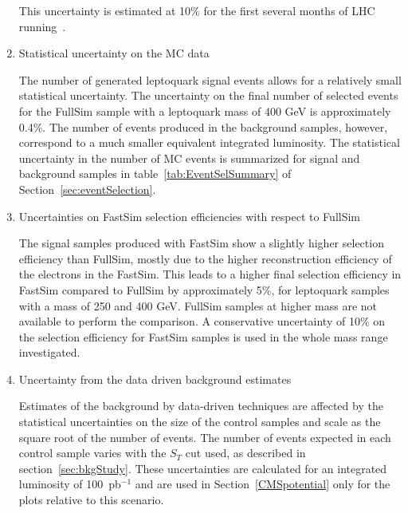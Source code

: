 \begin{enumerate}
This uncertainty is estimated at 10\% for the first several months of LHC running~\cite{PTDR}. 
%
\item Statistical uncertainty on the MC data

The number of generated leptoquark signal events allows for a relatively small statistical uncertainty.
The uncertainty on the final number of selected events for the FullSim sample with a leptoquark mass of 400 GeV is 
approximately 0.4\%.  The number of events produced in the background samples, however, correspond to a much
smaller equivalent integrated luminosity.  
The statistical uncertainty in the number of MC events is summarized for signal and background samples 
in table~\ref{tab:EventSelSummary} of Section~\ref{sec:eventSelection}.  
%
\item Uncertainties on FastSim selection efficiencies with respect to FullSim

The signal samples produced with FastSim show a slightly higher selection efficiency than FullSim, 
mostly due to the higher reconstruction efficiency of the electrons in the FastSim. 
This leads to a higher final selection efficiency in FastSim compared to FullSim by approximately 5\%, 
for leptoquark samples with a mass of 250 and 400 GeV. FullSim samples at higher mass are not available 
to perform the comparison. A conservative uncertainty of 10\% on the selection efficiency 
for FastSim samples is used in the whole mass range investigated. 
%
\item Uncertainty from the data driven background estimates

Estimates of the background by data-driven techniques are affected by the statistical
uncertainties on the size of the control samples and scale as the square root of the number of events.
The number of events expected in each control sample varies with the $S_T$ cut used, as 
described in section~\ref{sec:bkgStudy}. 
These uncertainties are calculated for an integrated luminosity of 100~pb$^{-1}$ 
and are used in Section~\ref{CMSpotential} only for the plots relative to this scenario.




\end{enumerate}
